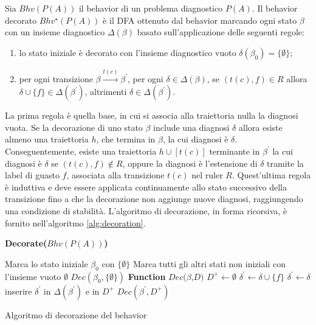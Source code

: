 \begin{defn}
Sia $Bhv(P(A))$ il behavior di un problema diagnostico $P(A)$. Il behavior decorato $Bhv^\star(P(A))$ è il DFA ottenuto dal behavior marcando ogni stato $\beta$ con un insieme diagnostico $\Delta(\beta)$ basato sull'applicazione delle seguenti regole:
\begin{enumerate}
\item lo stato iniziale è decorato con l'insieme diagnostico vuoto $\delta(\beta_0) = \{\emptyset\}$;
\item per ogni transizione $\beta \xrightarrow{t(c)} \beta^\prime$, per ogni $\delta \in \Delta(\beta)$, se $(t(c),f) \in R$ allora $\delta \cup \{f\} \in \Delta(\beta^\prime)$, altrimenti $\delta \in \Delta(\beta^\prime)$.
\end{enumerate}
\end{defn}
La prima regola è quella base, in cui si associa alla traiettoria nulla la diagnosi vuota.
Se la decorazione di uno stato $\beta$ include una diagnosi $\delta$ allora esiste almeno una traiettoria $h$, che termina in $\beta$, la cui diagnosi è $\delta$. Conseguentemente, esiste una traiettoria $h \cup [t(c)]$ terminante in $\beta^\prime$ la cui diagnosi è $\delta$ se $(t(c),f) \notin R$, oppure la diagnosi è l'estensione di $\delta$ tramite la label di guasto $f$, associata alla transizione $t(c)$ nel ruler $R$. 
Quest'ultima regola è induttiva e deve essere applicata continuamente allo stato successivo della transizione fino a che la decorazione non aggiunge nuove diagnosi, raggiungendo una condizione di stabilità.
L'algoritmo di decorazione, in forma ricorsiva, è fornito nell'algoritmo \ref{alg:decoration}.

\begin{algorithm}
\textbf{Decorate($Bhv(P(A))$)}
\begin{algorithmic}
\STATE Marca lo stato iniziale $\beta_0$ con $\{\emptyset\}$ 
\STATE Marca tutti gli altri stati non iniziali con l'insieme vuoto $\emptyset$
\STATE $Dec(\beta_0,\{\emptyset\})$
\STATE
\STATE \textbf{Function} $Dec(\beta$,$D)$
		\STATE $D^+ \leftarrow \emptyset$
				\STATE $\delta^\prime \leftarrow \delta \cup \{f\}$
			\ELSE
				\STATE $\delta^\prime \leftarrow \delta$
			\ENDIF
			\IF{$\delta^\prime \notin \Delta(\beta^\prime)$}
				\STATE inserire $\delta^\prime$ in $\Delta(\beta^\prime)$ e in $D^+$
			\ENDIF
		\ENDFOR
			\STATE $Dec(\beta^\prime, D^+)$
		\ENDIF
	\ENDFOR
\end{algorithmic}
\caption{Algoritmo di decorazione del behavior}
\label{alg:decoration}
\end{algorithm}


